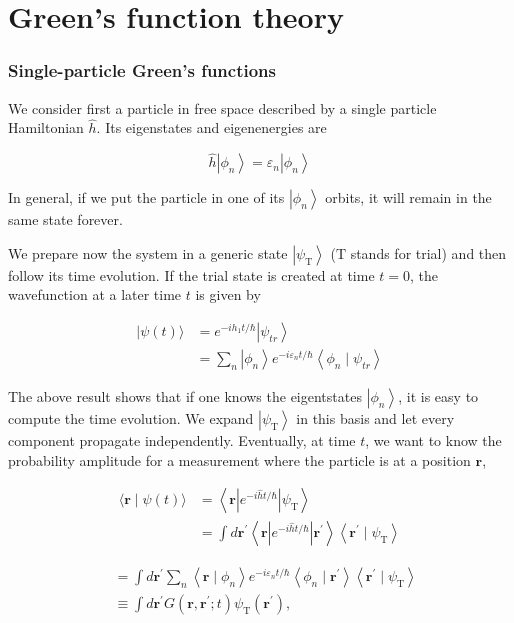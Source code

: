 
% 
\chapter{Green's function theory}

\subsection{Single-particle Green's functions}

We consider first a particle in free space described by a single particle Hamiltonian $\hat{h}$. Its eigenstates and eigenenergies are

$$
\hat{h}\left|\phi_{n}\right\rangle=\varepsilon_{n}\left|\phi_{n}\right\rangle
$$

In general, if we put the particle in one of its
$\left|\phi_{n}\right\rangle$ orbits, it will remain in the same state
forever.

We prepare now the system in a generic state
$\left|\psi_{\mathrm{T}}\right\rangle$ ($\mathrm{T}$ stands for trial) and then
follow its time evolution. If the trial state is created at time
$t=0$, the wavefunction at a later time $t$ is given by

$$
\begin{aligned}
|\psi(t)\rangle & =e^{-i h_{1} t / \hbar}\left|\psi_{t r}\right\rangle \\
& =\sum_{n}\left|\phi_{n}\right\rangle e^{-i \varepsilon_{n} t / \hbar}\left\langle\phi_{n} \mid \psi_{t r}\right\rangle
\end{aligned}
$$


The above result shows that if one knows the eigentstates
$\left|\phi_{n}\right\rangle$, it is easy to compute the
time evolution. We expand $\left|\psi_{\mathrm{T}}\right\rangle$ in this
basis and let every component propagate independently. Eventually, at
time $t$, we want to know the probability amplitude for a  measurement
where  the particle is at a position $\mathbf{r}$,

$$
\begin{aligned}
\langle\mathbf{r} \mid \psi(t)\rangle & =\left\langle\mathbf{r}\left|e^{-i \hat{h} t / \hbar}\right| \psi_{\mathrm{T}}\right\rangle \\
& =\int d \mathbf{r}^{\prime}\left\langle\mathbf{r}\left|e^{-i \hat{h} t / \hbar}\right| \mathbf{r}^{\prime}\right\rangle\left\langle\mathbf{r}^{\prime} \mid \psi_{\mathrm{T}}\right\rangle
\end{aligned}
$$

$$
\begin{aligned}
& =\int d \mathbf{r}^{\prime} \sum_{n}\left\langle\mathbf{r} \mid \phi_{n}\right\rangle e^{-i \varepsilon_{n} t / \hbar}\left\langle\phi_{n} \mid \mathbf{r}^{\prime}\right\rangle\left\langle\mathbf{r}^{\prime} \mid \psi_{\mathrm{T}}\right\rangle \\
& \equiv \int d \mathbf{r}^{\prime} G\left(\mathbf{r}, \mathbf{r}^{\prime} ; t\right) \psi_{\mathrm{T}}\left(\mathbf{r}^{\prime}\right),
\end{aligned}
$$

